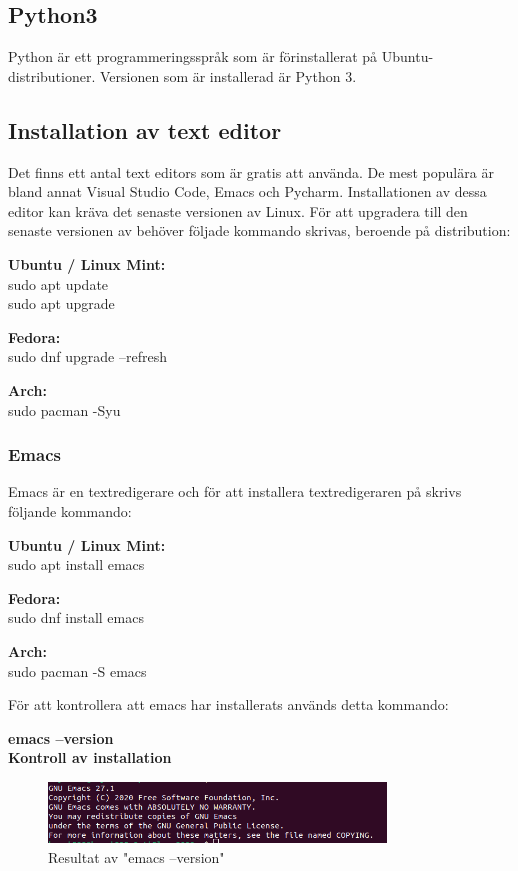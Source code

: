 \documentclass{TDP003mall}
\begin{document}
\subsection{Python3}
Python är ett programmeringsspråk som är förinstallerat på Ubuntu-distributioner. Versionen som är installerad är Python 3.
\subsection{Installation av text editor}

Det finns ett antal text editors som är gratis att använda. De mest populära är bland annat Visual Studio Code, Emacs och Pycharm.
Installationen av dessa editor kan kräva det senaste versionen av Linux. För att upgradera till den senaste versionen av behöver följade kommando skrivas, beroende på distribution:

\textbf{Ubuntu / Linux Mint:}\\
sudo apt update\\
sudo apt upgrade

\textbf{Fedora:}\\
sudo dnf upgrade --refresh

\textbf{Arch:}\\
sudo pacman -Syu

\subsubsection*{Emacs}

Emacs är en textredigerare och för att installera textredigeraren på skrivs följande kommando:

\textbf{Ubuntu / Linux Mint:}\\
sudo apt install emacs

\textbf{Fedora:}\\
sudo dnf install emacs

\textbf{Arch:}\\
sudo pacman -S emacs

För att kontrollera att emacs har installerats används detta kommando:

\textbf{emacs --version}\\

\textbf{Kontroll av installation}
\begin{figure}[H]
        \centering
        \includegraphics[width=0.8\textwidth]{images/emacs kontroll.png}
        \caption{Resultat av "emacs --version"}
\end{figure}
\end{document}
